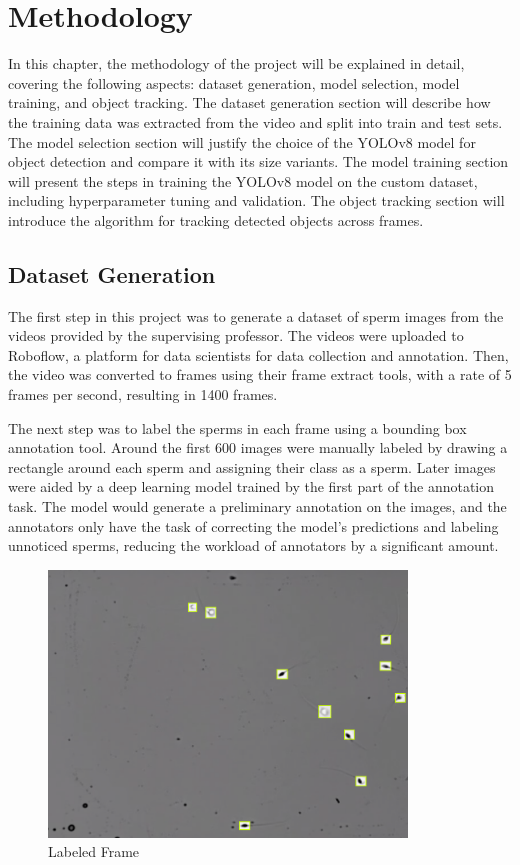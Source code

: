 \chapter{Methodology}
In this chapter, the methodology of the project will be explained in detail, covering the following aspects: dataset generation, model selection, model training, and object tracking. The dataset generation section will describe how the training data was extracted from the video and split into train and test sets. The model selection section will justify the choice of the YOLOv8 model for object detection and compare it with its size variants. The model training section will present the steps in training the YOLOv8 model on the custom dataset, including hyperparameter tuning and validation. The object tracking section will introduce the algorithm for tracking detected objects across frames. 
\newpage
\section{Dataset Generation}
The first step in this project was to generate a dataset of sperm images from the videos provided by the supervising professor. The videos were uploaded to Roboflow, a platform for data scientists for data collection and annotation. Then, the video was converted to frames using their frame extract tools, with a rate of 5 frames per second, resulting in 1400 frames. 

The next step was to label the sperms in each frame using a bounding box annotation tool. Around the first 600 images were manually labeled by drawing a rectangle around each sperm and assigning their class as a sperm. Later images were aided by a deep learning model trained by the first part of the annotation task. The model would generate a preliminary annotation on the images, and the annotators only have the task of correcting the model's predictions and labeling unnoticed sperms, reducing the workload of annotators by a significant amount. 

\begin{figure}[h]
\centering
\includegraphics[width=0.85\textwidth]{Images/Labeled Frame.png}
\caption{Labeled Frame}
\end{figure}

